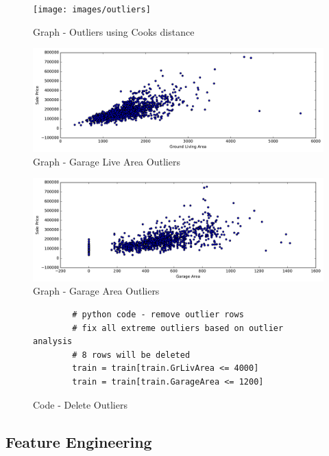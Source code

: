 \documentclass[sigconf]{acmart}
\begin{document}
	\begin{figure}[htb]
		\centering
		\texttt{[image: images/outliers]}	
		\caption{Graph - Outliers using Cooks distance} \label{fig:outliers} 
	\end{figure}
	
	\begin{figure}[htb]
		\centering
		\includegraphics[width=1.0\columnwidth]{images/gr_liv_area_outlier}	
		\caption{Graph - Garage Live Area Outliers} \label{fig:gr-liv-area-outlier} 
	\end{figure}
	
	\begin{figure}[htb]
		\centering
		\includegraphics[width=1.0\columnwidth]{images/garage_area_outlier}	
		\caption{Graph - Garage Area Outliers} \label{fig:garage-area-outlier} 
	\end{figure}
	
	\begin{figure}[htb]				
		\begin{verbatim}	
		# python code - remove outlier rows
		# fix all extreme outliers based on outlier analysis
		# 8 rows will be deleted
		train = train[train.GrLivArea <= 4000]
		train = train[train.GarageArea <= 1200]
		\end{verbatim}
		\caption{Code - Delete Outliers} \label{c:code-del-outliers} 
	\end{figure}
	
	\subsection{Feature Engineering}
	
\end{document}
